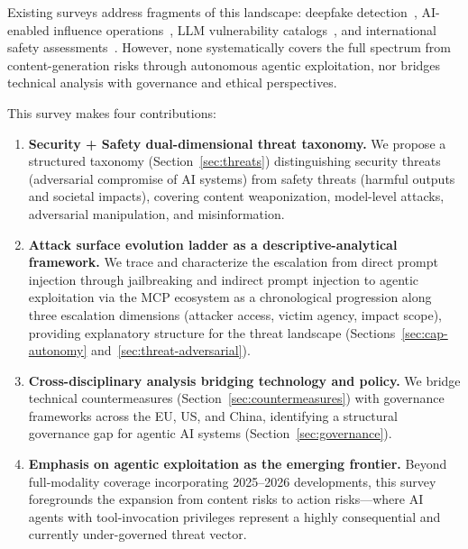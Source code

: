 
Existing surveys address fragments of this landscape: deepfake detection~\cite{pei2024deepfakesurvey}, AI-enabled influence operations~\cite{spitale2023gpt3}, LLM vulnerability catalogs~\cite{owasp2025}, and international safety assessments~\cite{aisafetyreport2025,aisafetyreport2026}. However, none systematically covers the full spectrum from content-generation risks through autonomous agentic exploitation, nor bridges technical analysis with governance and ethical perspectives.

This survey makes four contributions:
\begin{enumerate}[nosep,leftmargin=1.5em]
    \item \textbf{Security + Safety dual-dimensional threat taxonomy.} We propose a structured taxonomy (Section~\ref{sec:threats}) distinguishing security threats (adversarial compromise of AI systems) from safety threats (harmful outputs and societal impacts), covering content weaponization, model-level attacks, adversarial manipulation, and misinformation.
    \item \textbf{Attack surface evolution ladder as a descriptive-analytical framework.} We trace and characterize the escalation from direct prompt injection through jailbreaking and indirect prompt injection to agentic exploitation via the MCP ecosystem as a chronological progression along three escalation dimensions (attacker access, victim agency, impact scope), providing explanatory structure for the threat landscape (Sections~\ref{sec:cap-autonomy} and~\ref{sec:threat-adversarial}).
    \item \textbf{Cross-disciplinary analysis bridging technology and policy.} We bridge technical countermeasures (Section~\ref{sec:countermeasures}) with governance frameworks across the EU, US, and China, identifying a structural governance gap for agentic AI systems (Section~\ref{sec:governance}).
    \item \textbf{Emphasis on agentic exploitation as the emerging frontier.} Beyond full-modality coverage incorporating 2025--2026 developments, this survey foregrounds the expansion from content risks to action risks---where AI agents with tool-invocation privileges represent a highly consequential and currently under-governed threat vector.
\end{enumerate}


